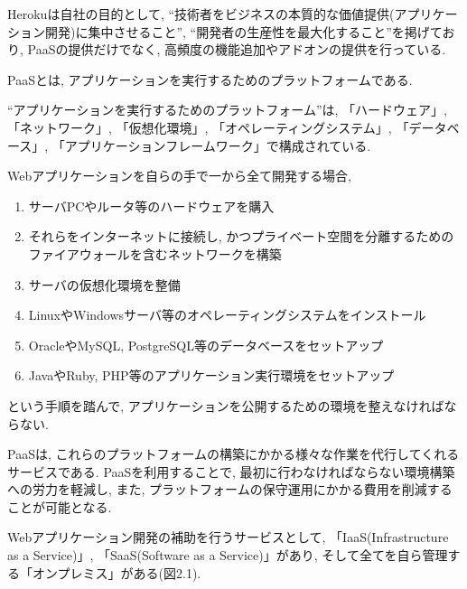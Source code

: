 Herokuは自社の目的として, “技術者をビジネスの本質的な価値提供(アプリケーション開発)に集中させること”, “開発者の生産性を最大化すること”を掲げており, PaaSの提供だけでなく, 高頻度の機能追加やアドオンの提供を行っている.

PaaSとは, アプリケーションを実行するためのプラットフォームである.

“アプリケーションを実行するためのプラットフォーム”は, 「ハードウェア」, 「ネットワーク」, 「仮想化環境」, 「オペレーティングシステム」, 「データベース」, 「アプリケーションフレームワーク」で構成されている.

Webアプリケーションを自らの手で一から全て開発する場合,
\begin{enumerate}
\item サーバPCやルータ等のハードウェアを購入

\item それらをインターネットに接続し, かつプライベート空間を分離するためのファイアウォールを含むネットワークを構築

\item サーバの仮想化環境を整備

\item LinuxやWindowsサーバ等のオペレーティングシステムをインストール

\item OracleやMySQL, PostgreSQL等のデータベースをセットアップ

\item JavaやRuby, PHP等のアプリケーション実行環境をセットアップ
\end{enumerate}

という手順を踏んで, アプリケーションを公開するための環境を整えなければならない.

PaaSは, これらのプラットフォームの構築にかかる様々な作業を代行してくれるサービスである.
PaaSを利用することで, 最初に行わなければならない環境構築への労力を軽減し, また, プラットフォームの保守運用にかかる費用を削減することが可能となる.

Webアプリケーション開発の補助を行うサービスとして, 「IaaS(Infrastructure as a Service)」, 「SaaS(Software as a Service)」があり, そして全てを自ら管理する「オンプレミス」がある(図2.1).

